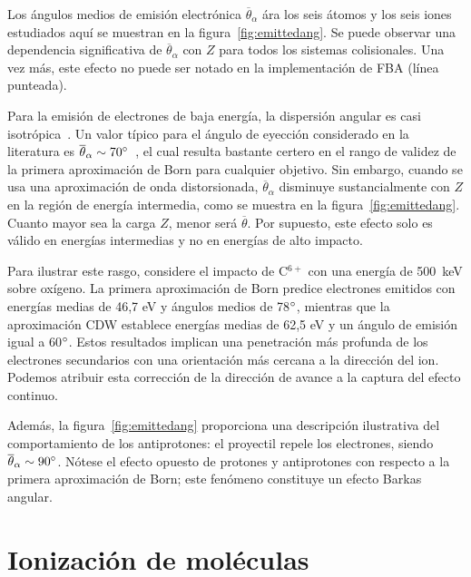 Los ángulos medios de emisión electrónica $\overline{\theta}_{\alpha}$ 
ára los seis átomos y los seis iones estudiados aquí se muestran en la 
figura~\ref{fig:emittedang}. Se puede observar una dependencia 
significativa de $\overline{\theta}_{\alpha}$ con $Z$ para todos los 
sistemas colisionales. Una vez más, este efecto no puede ser notado en 
la implementación de FBA (línea punteada).

Para la emisión de electrones de baja energía, la dispersión angular 
es casi isotrópica~\cite{Rudd1992}. Un valor típico para el ángulo de 
eyección considerado en la literatura es 
$\overline{\theta}_{\alpha}\sim 70\degree$~\cite{surdutovic2018}, el cual
resulta bastante certero en el rango de validez de la primera 
aproximación de Born para cualquier objetivo. Sin embargo, cuando se 
usa una aproximación de onda distorsionada, $\overline{\theta}_{\alpha}$
disminuye sustancialmente con $Z$ en la región de energía intermedia, 
como se muestra en la figura~\ref{fig:emittedang}. Cuanto mayor sea la 
carga $Z$, menor será $\overline{\theta}$. Por supuesto, este efecto 
solo es válido en energías intermedias y no en energías de alto impacto.

Para ilustrar este rasgo, considere el impacto de C$^{6+}$ con una 
energía de 500~keV sobre oxígeno. La primera aproximación de Born 
predice electrones emitidos con energías medias de 46,7 eV y ángulos 
medios de 78$\degree$, mientras que la aproximación CDW establece 
energías medias de 62,5 eV y un ángulo de emisión igual a 60$\degree$. 
Estos resultados implican una penetración más profunda de los electrones 
secundarios con una orientación más cercana a la dirección del ion. 
Podemos atribuir esta corrección de la dirección de avance a la captura 
del efecto continuo.

Además, la figura~\ref{fig:emittedang} proporciona una descripción 
ilustrativa del comportamiento de los antiprotones: el proyectil repele 
los electrones, siendo $\overline{\theta}_{\alpha}\sim 90\degree$. 
Nótese el efecto opuesto de protones y antiprotones con respecto a la 
primera aproximación de Born; este fenómeno constituye un efecto Barkas 
angular.

\section{Ionización de moléculas}
\label{sec:molecules}
